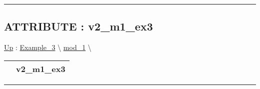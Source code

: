 \rule{\linewidth}{0.5pt}

\subsection*{ATTRIBUTE : v2\_m1\_ex3}
\hypertarget{ecldoc:inintest.example_3.mod_1.v2_m1_ex3}{}
\hyperlink{ecldoc:Inintest.Example_3.mod_1}{Up} :
\hspace{0pt} \hyperlink{ecldoc:Inintest.Example_3}{Example_3} \textbackslash 
\hspace{0pt} \hyperlink{ecldoc:Inintest.Example_3.mod_1}{mod_1} \textbackslash 

{\renewcommand{\arraystretch}{1.5}
\begin{tabularx}{\textwidth}{|>{\raggedright\arraybackslash}l|X|}
\hline
\hspace{0pt} & v2\_m1\_ex3 \\
\hline
\end{tabularx}
}

\par


\rule{\linewidth}{0.5pt}




